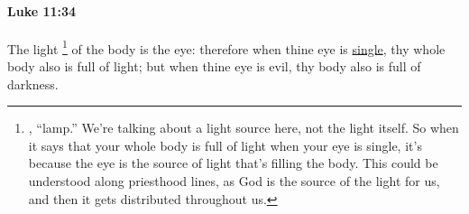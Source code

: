 			\begin{framed}
			\scriptsize
				\begin{compactdesc}
					\item[SBLG] 
				\end{compactdesc}
			\end{framed}

		\paragraph{Luke 11:34} %
			\label{LUKE-11-34}

			The light%
				\footnote{%
					\hyperref[LUCHNOS]{}, ``lamp.'' We're talking about a light source here, not the light itself. So when it says that your whole body is full of light when your eye is single, it's because the eye is the source of light that's filling the body. This could be understood along priesthood lines, as God is the source of the light for us, and then it gets distributed throughout us.
					}
			of the body is the eye: therefore when thine eye is \hyperref[SINGLE]{single}, thy whole body also is full of light; but when thine eye is evil, thy body also is full of darkness.

